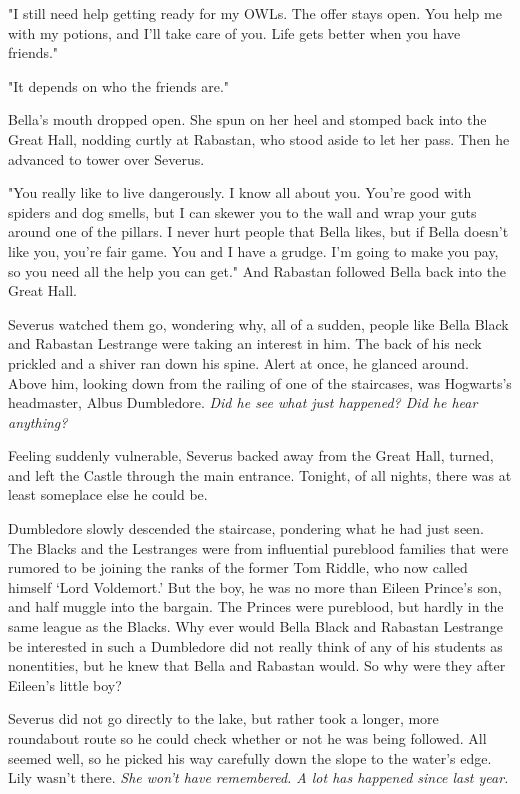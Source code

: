 "I still need help getting ready for my OWLs. The offer stays open. You help me with my potions, and I'll take care of you. Life gets better when you have friends."

"It depends on who the friends are."

Bella's mouth dropped open. She spun on her heel and stomped back into the Great Hall, nodding curtly at Rabastan, who stood aside to let her pass. Then he advanced to tower over Severus.

"You really like to live dangerously. I know all about you. You're good with spiders and dog smells, but I can skewer you to the wall and wrap your guts around one of the pillars. I never hurt people that Bella likes, but if Bella doesn't like you, you're fair game. You and I have a grudge. I'm going to make you pay, so you need all the help you can get." And Rabastan followed Bella back into the Great Hall.

Severus watched them go, wondering why, all of a sudden, people like Bella Black and Rabastan Lestrange were taking an interest in him. The back of his neck prickled and a shiver ran down his spine. Alert at once, he glanced around. Above him, looking down from the railing of one of the staircases, was Hogwarts's headmaster, Albus Dumbledore. \emph{Did he see what just happened? Did he hear anything?}

Feeling suddenly vulnerable, Severus backed away from the Great Hall, turned, and left the Castle through the main entrance. Tonight, of all nights, there was at least someplace else he could be.

Dumbledore slowly descended the staircase, pondering what he had just seen. The Blacks and the Lestranges were from influential pureblood families that were rumored to be joining the ranks of the former Tom Riddle, who now called himself `Lord Voldemort.' But the boy, he was no more than Eileen Prince's son, and half muggle into the bargain. The Princes were pureblood, but hardly in the same league as the Blacks. Why ever would Bella Black and Rabastan Lestrange be interested in such a{\el} Dumbledore did not really think of any of his students as nonentities, but he knew that Bella and Rabastan would. So why were they after Eileen's little boy?

Severus did not go directly to the lake, but rather took a longer, more roundabout route so he could check whether or not he was being followed. All seemed well, so he picked his way carefully down the slope to the water's edge. Lily wasn't there. \emph{She won't have remembered. A lot has happened since last year.}

